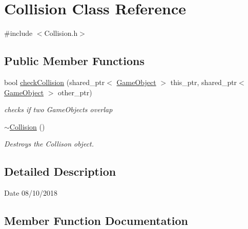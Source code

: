 \hypertarget{class_collision}{}\section{Collision Class Reference}
\label{class_collision}


{\ttfamily \#include $<$Collision.\+h$>$}

\subsection*{Public Member Functions}
\begin{DoxyCompactItemize}
\item 
bool \mbox{\hyperlink{class_collision_a43e40b319ff4d328b467877ab39710d5}{check\+Collision}} (shared\+\_\+ptr$<$ \mbox{\hyperlink{class_game_object}{Game\+Object}} $>$ this\+\_\+ptr, shared\+\_\+ptr$<$ \mbox{\hyperlink{class_game_object}{Game\+Object}} $>$ other\+\_\+ptr)
\begin{DoxyCompactList}\small\item\em checks if two Game\+Objects overlap \end{DoxyCompactList}\item 
\mbox{\label{class_collision_a19ae49bcb3b16f4622443a34a171590c}} 
\mbox{\hyperlink{class_collision_a19ae49bcb3b16f4622443a34a171590c}{$\sim$\+Collision}} ()
\begin{DoxyCompactList}\small\item\em Destroys the Collison object. \end{DoxyCompactList}\end{DoxyCompactItemize}


\subsection{Detailed Description}
\begin{DoxyDate}{Date}
08/10/2018 
\end{DoxyDate}


\subsection{Member Function Documentation}
\mbox{\label{class_collision_a43e40b319ff4d328b467877ab39710d5}} 
